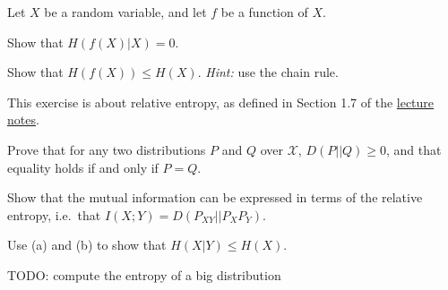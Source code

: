 \documentclass[a4paper,10pt,landscape,twocolumn]{scrartcl}
\begin{document}
\begin{exercise}
Let $X$ be a random variable, and let $f$ be a function of $X$.
	\begin{subex}[(1pt)]
	Show that $H(f(X) | X) = 0$.
	\end{subex}
	\begin{subex}[(2pt)]
	Show that $H(f(X)) \leq H(X)$. \emph{Hint:} use the chain rule.
	\end{subex}
\end{exercise}


\begin{exercise}
This exercise is about relative entropy, as defined in Section 1.7 of the \href{https://github.com/cschaffner/InformationTheory/raw/master/Script/InfTheory3.pdf}{lecture notes}. 
	\begin{subex}[(5pt)]
	Prove that for any two distributions $P$ and $Q$ over $\mathcal{X}$, $D(P||Q) \geq 0$, and that equality holds if and only if $P = Q$.
	\end{subex}
	\begin{subex}[(3pt)]
	Show that the mutual information can be expressed in terms of the relative entropy, i.e.\ that $I(X;Y) = D(P_{XY}||P_XP_Y)$.
	\end{subex}
	\begin{subex}[(1pt)]
	Use (a) and (b) to show that $H(X|Y) \leq H(X)$.
	\end{subex}
\end{exercise}



\begin{exercise}[Programming... (5pt)]
TODO: compute the entropy of a big distribution
\end{exercise}
\end{document}
